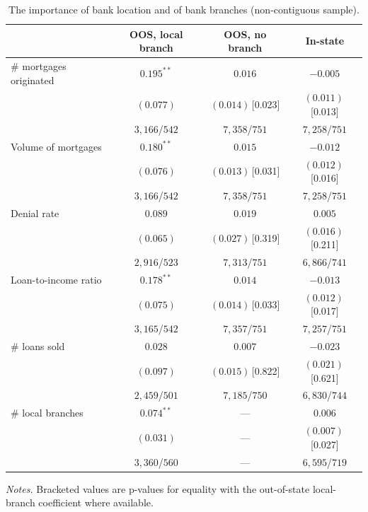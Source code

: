 
 
\begin{table}[htbp]
  \centering
  \caption{The importance of bank location and of bank branches (non-contiguous sample).}
  \label{tab:banktype-noncontig}
  \small
  \begin{tabular}{lccc}
    \toprule
     & OOS, local branch & OOS, no branch & In-state \\
    \midrule
    \# mortgages originated & $0.195^{**}$ & $0.016$ & $-0.005$ \\
                            & $(0.077)$ & $(0.014)$\,[0.023] & $(0.011)$\,[0.013] \\
                            & {\scriptsize $3,166$/$542$} & {\scriptsize $7,358$/$751$} & {\scriptsize $7,258$/$751$} \\
    \addlinespace
    Volume of mortgages & $0.180^{**}$ & $0.015$ & $-0.012$ \\
                            & $(0.076)$ & $(0.013)$\,[0.031] & $(0.012)$\,[0.016] \\
                            & {\scriptsize $3,166$/$542$} & {\scriptsize $7,358$/$751$} & {\scriptsize $7,258$/$751$} \\
    \addlinespace
    Denial rate & $0.089$ & $0.019$ & $0.005$ \\
                            & $(0.065)$ & $(0.027)$\,[0.319] & $(0.016)$\,[0.211] \\
                            & {\scriptsize $2,916$/$523$} & {\scriptsize $7,313$/$751$} & {\scriptsize $6,866$/$741$} \\
    \addlinespace
    Loan-to-income ratio & $0.178^{**}$ & $0.014$ & $-0.013$ \\
                            & $(0.075)$ & $(0.014)$\,[0.033] & $(0.012)$\,[0.017] \\
                            & {\scriptsize $3,165$/$542$} & {\scriptsize $7,357$/$751$} & {\scriptsize $7,257$/$751$} \\
    \addlinespace
    \# loans sold & $0.028$ & $0.007$ & $-0.023$ \\
                            & $(0.097)$ & $(0.015)$\,[0.822] & $(0.021)$\,[0.621] \\
                            & {\scriptsize $2,459$/$501$} & {\scriptsize $7,185$/$750$} & {\scriptsize $6,830$/$744$} \\
    \addlinespace
    \# local branches & $0.074^{**}$ & --- & $0.006$ \\
                            & $(0.031)$ & --- & $(0.007)$\,[0.027] \\
                            & {\scriptsize $3,360$/$560$} & --- & {\scriptsize $6,595$/$719$} \\
    \bottomrule
  \end{tabular}
  \begin{tablenotes}\footnotesize
  \item \emph{Notes.} Bracketed values are p-values for equality with the out-of-state local-branch coefficient where available.
  \end{tablenotes}
\end{table}

